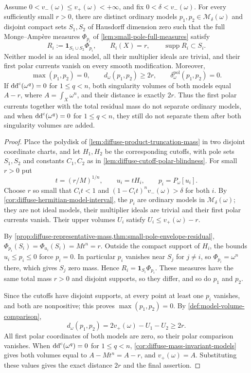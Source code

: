 \begin{proposition}\label{prop:disjoint-diffuse-scalar-obstruction}
Assume $0<v_-(\omega)\leq v_+(\omega)<+\infty$, and fix $0<\delta<v_-(\omega)$. For every sufficiently small $r>0$, there are distinct ordinary models $p_1,p_2\in\mathcal M_\delta(\omega)$ and disjoint compact sets $S_1,S_2$ of Hausdorff dimension zero such that the full Monge--Amp\`ere measures $\Phi_{p_i}$ of \cref{lem:small-pole-full-measures} satisfy
\[
 R_i:=\mathbf1_{S_1\cup S_2}\Phi_{p_i},\qquad
 R_i(X)=r,\qquad \operatorname{supp}R_i\subset S_i.
\]
Neither model is an ideal model, all their multiplier ideals are trivial, and their first polar currents vanish on every smooth modification. Moreover,
\[
 \max(p_1,p_2)=0,\qquad
 d_\omega(p_1,p_2)\geq2r,
 \qquad\delta_\omega^{\mathrm{pol}}(p_1,p_2)=0.
\]
If $\mathrm{dd}^{\mathrm{c}}(\omega^q)=0$ for $1\leq q<n$, both singularity volumes of both models equal $A-r$, where $A=\int_X\omega^n$, and their distance is exactly $2r$. Thus the first polar currents together with the total residual mass do not separate ordinary models, and when $\mathrm{dd}^{\mathrm{c}}(\omega^q)=0$ for $1\leq q<n$, they still do not separate them after both singularity volumes are added.
\end{proposition}
\begin{proof}
Place the polydisk of \cref{lem:diffuse-product-truncation-mass} in two disjoint coordinate charts, and let $H_1,H_2$ be the corresponding cutoffs, with pole sets $S_1,S_2$ and constants $C_1,C_2$ as in \cref{lem:diffuse-cutoff-polar-blindness}. For small $r>0$ put
\[
 t=(r/M)^{1/n},\qquad
 u_i=tH_i,\qquad p_i=P_\omega[u_i].
\]
Choose $r$ so small that $C_it<1$ and $(1-C_it)^nv_-(\omega)>\delta$ for both $i$. By \cref{cor:diffuse-hermitian-model-interval}, the $p_i$ are ordinary models in $\mathcal M_\delta(\omega)$; they are not ideal models, their multiplier ideals are trivial and their first polar currents vanish. Their upper volumes $U_i$ satisfy $U_i\leq v_+(\omega)-r$.

By \cref{prop:diffuse-representative-mass,thm:small-pole-envelope-residual}, $\Phi_{p_i}(S_i)=\Phi_{u_i}(S_i)=Mt^n=r$. Outside the compact support of $H_i$, the bounds $u_i\leq p_i\leq0$ force $p_i=0$. In particular $p_i$ vanishes near $S_j$ for $j\ne i$, so $\Phi_{p_i}=\omega^n$ there, which gives $S_j$ zero mass. Hence $R_i=\mathbf1_{S_i}\Phi_{p_i}$. These measures have the same total mass $r>0$ and disjoint supports, so they differ, and so do $p_1$ and $p_2$.

Since the cutoffs have disjoint supports, at every point at least one $p_i$ vanishes, and both are nonpositive; this proves $\max(p_1,p_2)=0$. By \cref{def:model-volume-comparison},
\[
 d_\omega(p_1,p_2)=2v_+(\omega)-U_1-U_2\geq2r.
\]
All first polar coordinates of both models are zero, so their polar comparison vanishes. When $\mathrm{dd}^{\mathrm{c}}(\omega^q)=0$ for $1\leq q<n$, \cref{cor:diffuse-mass-invariant-models} gives both volumes equal to $A-Mt^n=A-r$, and $v_+(\omega)=A$. Substituting these values gives the exact distance $2r$ and the final assertion.
\end{proof}

